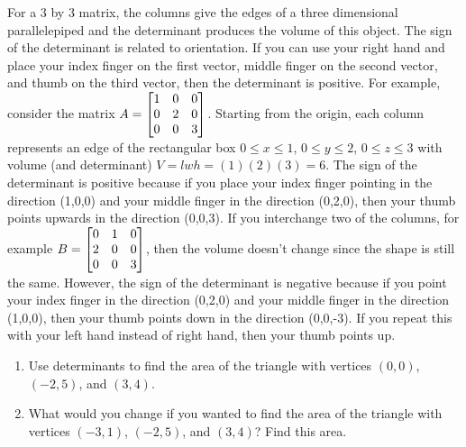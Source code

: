 
For a 3 by 3 matrix, the columns give the edges of a three dimensional parallelepiped and the determinant produces the volume of this object. The sign of the determinant is related to orientation. If you can use your right hand and place your index finger on the first vector, middle finger on the second vector, and thumb on the third vector, then the determinant is positive. 
For example, consider the matrix $A = \begin{bmatrix} \begin{matrix} 1\\0\\0 \end{matrix} & \begin{matrix} 0\\2\\0 \end{matrix} & \begin{matrix} 0\\0\\3 \end{matrix} \end{bmatrix}$.  Starting from the origin, each column represents an edge of the rectangular box 
$0\leq x\leq 1$, 
$0\leq y\leq 2$, 
$0\leq z\leq 3$ with volume (and determinant) $V=lwh=(1)(2)(3)=6$. The sign of the determinant is positive because if you place your index finger pointing in the direction (1,0,0) and your middle finger in the direction (0,2,0), then your thumb points upwards in the direction (0,0,3). 
If you interchange two of the columns, for example 
$B = \begin{bmatrix}  \begin{matrix} 0\\2\\0 \end{matrix} & \begin{matrix} 1\\0\\0 \end{matrix} & \begin{matrix} 0\\0\\3 \end{matrix} \end{bmatrix}$, then the volume doesn't change since the shape is still the same. However, the sign of the determinant is negative because if you point your index finger in the direction (0,2,0) and your middle finger in the direction (1,0,0), then your thumb points down in the direction (0,0,-3). If you repeat this with your left hand instead of right hand, then your thumb points up.

\begin{problem}
\begin{enumerate}
\item Use determinants to find the area of the triangle with vertices $(0,0)$, $(-2,5)$, and $(3,4)$.
\item What would you change if you wanted to find the area of the triangle with vertices $(-3,1)$, $(-2,5)$, and $(3,4)$? Find this area.
\end{enumerate}
\end{problem}

